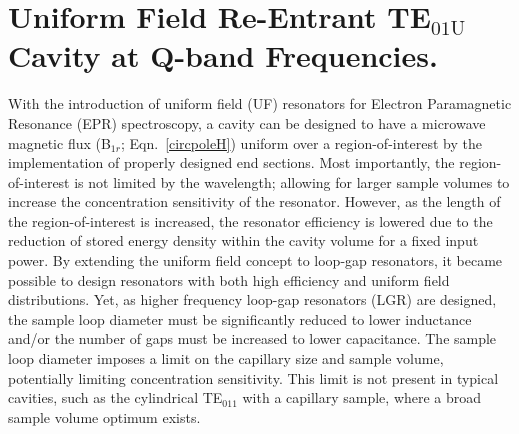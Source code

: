 \chapter[Uniform Field TE01U Cavity at Q-band Frequencies]{Uniform Field Re-Entrant TE$_{01\text{U}}$ Cavity at Q-band Frequencies.}

With the introduction of uniform field (UF) resonators for Electron Paramagnetic Resonance (EPR) spectroscopy, a cavity can be designed to have a microwave magnetic flux (B$_{1r}$; Eqn.~\ref{circpoleH}) uniform over a region-of-interest by the implementation of properly designed end sections. \cite{mett2001axially, anderson2002, mett2002recav, hyde2004cavity} Most importantly, the region-of-interest is not limited by the wavelength; allowing for larger sample volumes to increase the concentration sensitivity of the resonator. However, as the length of the region-of-interest is increased, the resonator efficiency is lowered due to the reduction of stored energy density within the cavity volume for a fixed input power. By extending the uniform field concept to loop-gap resonators,\cite{UFLGR} it became possible to design resonators with both high efficiency and uniform field distributions. \cite{UFLGR2017}  
Yet, as higher frequency loop-gap resonators (LGR) are designed, the sample loop diameter must be significantly reduced to lower inductance and/or the number of gaps must be increased to lower capacitance. \cite{Sidabras2007, MainaliLGR, UFLGR2017} The sample loop diameter imposes a limit on the capillary size and sample volume, potentially limiting concentration sensitivity. This limit is not present in typical cavities, such as the cylindrical TE$_{011}$ with a capillary sample, where a broad sample volume optimum exists. \cite{Nesmelov2004} 

